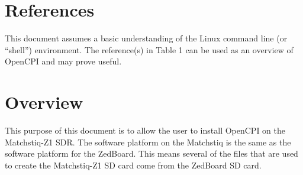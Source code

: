 \newpage

\tableofcontents

\newpage

\section{References}

	This document assumes a basic understanding of the Linux command line (or ``shell'') environment.  The reference(s) in Table 1 can be used as an overview of OpenCPI and may prove useful.

\def\refcapbottom{}


\newpage
\section{Overview}
This purpose of this document is to allow the user to install OpenCPI on the Matchstiq-Z1 SDR.  The software platform on the Matchstiq is the same as the software platform for the ZedBoard. This means several of the files that are used to create the Matchstiq-Z1 SD card come from the ZedBoard SD card.
